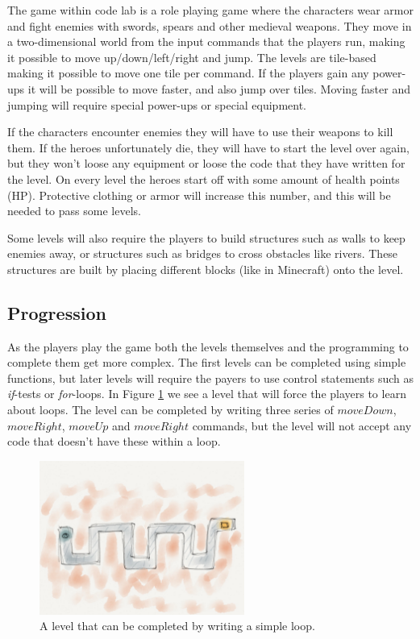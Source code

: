 \documentclass[12pt,journal,compsoc, a4paper, onecolumn]{IEEEtran}
\begin{document}
The game within code lab is a role playing game where the characters wear armor
and fight enemies with swords, spears and other medieval weapons. They move in a
two-dimensional world from the input commands that the players run, making it
possible to move up/down/left/right and jump. The levels are tile-based making
it possible to move one tile per command. If the players gain any power-ups it
will be possible to move faster, and also jump over tiles. Moving faster and
jumping will require special power-ups or special equipment. 

If the characters encounter enemies they will have to use their weapons to kill
them. If the heroes unfortunately die, they will have to start the level over
again, but they won't loose any equipment or loose the code that they have
written for the level. On every level the heroes start off with some amount of
health points (HP). Protective clothing or armor will increase this number, and
this will be needed to pass some levels. 

Some levels will also require the players to build structures such as walls to
keep enemies away, or structures such as bridges to cross obstacles like rivers.
These structures are built by placing different blocks (like in Minecraft) onto
the level. 

\subsection{Progression} 
As the players play the game both the levels themselves and the programming to
complete them get more complex. The first levels can be completed using simple
functions, but later levels will require the payers to use control statements
such as \emph{if}-tests or \emph{for}-loops. In Figure \ref{fig:loop} we see a
level that will force the players to learn about loops. The level can be
completed by writing three series of $moveDown$, $moveRight$, $moveUp$ and
$moveRight$ commands, but the level will not accept any code that doesn't have
these within a loop. 

\begin{figure}[htb]
    \begin{centering}
    \includegraphics[width=0.6\textwidth]{./figures/codelab4.jpg}
    \caption{A level that can be completed by writing a simple loop.} 
    \label{fig:loop}
    \end{centering} 
\end{figure}
\end{document}
